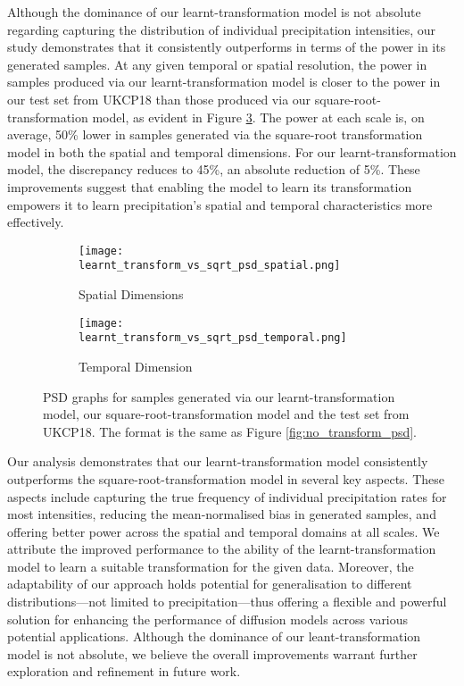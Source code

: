 \documentclass[ oneside,%
                    author={George Herbert},
                    degree={MSci},
                     title={Diffusion Models for Time-Evolving Precipitation Fields},
                  subtitle={}]{dissertation}
\begin{document}
Although the dominance of our learnt-transformation model is not absolute regarding capturing the distribution of individual precipitation intensities, our study demonstrates that it consistently outperforms in terms of the power in its generated samples. At any given temporal or spatial resolution, the power in samples produced via our learnt-transformation model is closer to the power in our test set from UKCP18 than those produced via our square-root-transformation model, as evident in Figure \ref{fig:learnt_transform_vs_sqrt_psd}. The power at each scale is, on average, 50\% lower in samples generated via the square-root transformation model in both the spatial and temporal dimensions. For our learnt-transformation model, the discrepancy reduces to 45\%, an absolute reduction of 5\%. These improvements suggest that enabling the model to learn its transformation empowers it to learn precipitation's spatial and temporal characteristics more effectively.

\begin{figure}[htbp]
      \centering
      \begin{subfigure}{.49\textwidth}
            \texttt{[image: learnt\_transform\_vs\_sqrt\_psd\_spatial.png]}
            \caption{Spatial Dimensions}
            \label{fig:learnt_transform_vs_sqrt_psd_spatial}
      \end{subfigure}
      \begin{subfigure}{.49\textwidth}
            \texttt{[image: learnt\_transform\_vs\_sqrt\_psd\_temporal.png]}
            \caption{Temporal Dimension}
            \label{fig:learnt_transform_vs_sqrt_psd_temporal}
      \end{subfigure}
      \caption{PSD graphs for samples generated via our learnt-transformation model, our square-root-transformation model and the test set from UKCP18. The format is the same as Figure \ref{fig:no_transform_psd}.}
      \label{fig:learnt_transform_vs_sqrt_psd}
\end{figure}

Our analysis demonstrates that our learnt-transformation model consistently outperforms the square-root-transformation model in several key aspects. These aspects include capturing the true frequency of individual precipitation rates for most intensities, reducing the mean-normalised bias in generated samples, and offering better power across the spatial and temporal domains at all scales. We attribute the improved performance to the ability of the learnt-transformation model to learn a suitable transformation for the given data. Moreover, the adaptability of our approach holds potential for generalisation to different distributions---not limited to precipitation---thus offering a flexible and powerful solution for enhancing the performance of diffusion models across various potential applications. Although the dominance of our leant-transformation model is not absolute, we believe the overall improvements warrant further exploration and refinement in future work.
\end{document}
